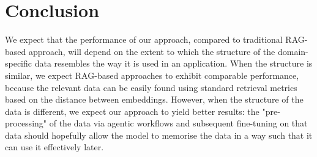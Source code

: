 \section{Conclusion}

We expect that the performance of our approach, compared to traditional
RAG-based approach, will depend on the extent to which the structure of the
domain-specific data resembles the way it is used in an application. When the
structure is similar, we expect RAG-based approaches to exhibit comparable
performance, because the relevant data can be easily found using standard
retrieval metrics based on the distance between embeddings. However, when the
structure of the data is different, we expect our approach to yield better
results: the "pre-processing" of the data via agentic workflows and subsequent
fine-tuning on that data should hopefully allow the model to memorise the data
in a way such that it can use it effectively later.
